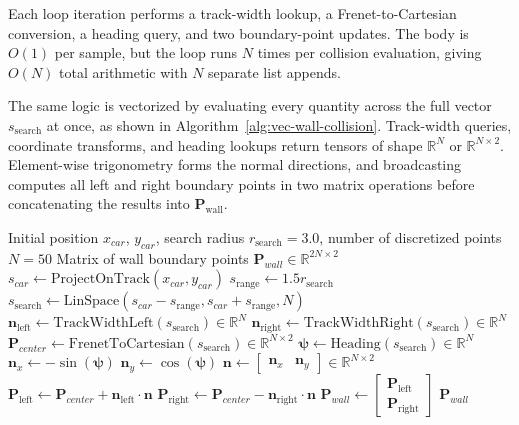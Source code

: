 Each loop iteration performs a track-width lookup, a Frenet-to-Cartesian conversion, a heading query, and two boundary-point updates.
The body is $O(1)$ per sample, but the loop runs $N$ times per collision evaluation, giving $O(N)$ total arithmetic with $N$ separate list appends.

The same logic is vectorized by evaluating every quantity across the full vector $s_{\text{search}}$ at once, as shown in Algorithm~\ref{alg:vec-wall-collision}.
Track-width queries, coordinate transforms, and heading lookups return tensors of shape $\mathbb{R}^{N}$ or $\mathbb{R}^{N \times 2}$.
Element-wise trigonometry forms the normal directions, and broadcasting computes all left and right boundary points in two matrix operations before concatenating the results into $\mathbf{P}_{\text{wall}}$.

\begin{algorithm}[htbp]
\caption{Vectorized Wall Collision}
\label{alg:vec-wall-collision}
\begin{algorithmic}[1]
\Require Initial position $x_{car}$, $y_{car}$, search radius $r_{\text{search}} = 3.0$, number of discretized points $N = 50$
\Ensure Matrix of wall boundary points $\mathbf{P}_{wall} \in \mathbb{R}^{2N \times 2}$
\State $s_{car} \gets \text{ProjectOnTrack}(x_{car}, y_{car})$ 
\State $s_{\text{range}} \gets  1.5r_{\text{search}}$
\State $s_{\text{search}} \gets \text{LinSpace}(s_{car} - s_{\text{range}}, s_{car} + s_{\text{range}}, N)$ 
\State $\mathbf{n}_{\text{left}} \gets \text{TrackWidthLeft}(s_{\text{search}}) \in \mathbb{R}^N$ 
\State $\mathbf{n}_{\text{right}} \gets \text{TrackWidthRight}(s_{\text{search}}) \in \mathbb{R}^N$ 
\State $\mathbf{P}_{center} \gets \text{FrenetToCartesian}(s_{\text{search}}) \in \mathbb{R}^{N \times 2}$ 
\State $\boldsymbol{\psi} \gets \text{Heading}(s_{\text{search}}) \in \mathbb{R}^N$ 
\State $\mathbf{n}_x \gets -\sin(\boldsymbol{\psi})$ 
\State $\mathbf{n}_y \gets \cos(\boldsymbol{\psi})$ 
\State $\mathbf{n} \gets \begin{bmatrix} \mathbf{n}_x & \mathbf{n}_y \end{bmatrix} \in \mathbb{R}^{N \times 2}$ 
\State $\mathbf{P}_{\text{left}} \gets \mathbf{P}_{center} + \mathbf{n}_{\text{left}} \cdot \mathbf{n}$ 
\State $\mathbf{P}_{\text{right}} \gets \mathbf{P}_{center} - \mathbf{n}_{\text{right}} \cdot \mathbf{n}$ 
\State $\mathbf{P}_{wall} \gets \begin{bmatrix} \mathbf{P}_{\text{left}} \\ \mathbf{P}_{\text{right}} \end{bmatrix}$ 
\State \Return $\mathbf{P}_{wall}$
\end{algorithmic}
\end{algorithm}

